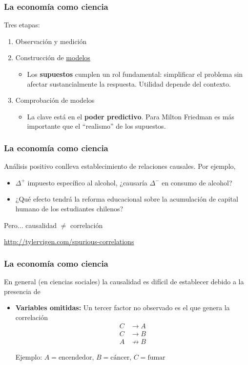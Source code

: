 \documentclass[dvipsnames,table]{beamer}
\newcommand{\peq}[1]{{\scriptscriptstyle{#1}}}
\begin{document}
		\begin{frame}
			\frametitle{La economía como ciencia}
			Tres etapas:
			\begin{enumerate}
				\item Observación y medición
				\item Construcción de \href{http://dle.rae.es/?id=PTk5Wk1}{modelos}
					\begin{itemize}
						\item Los \textbf{supuestos} cumplen un rol fundamental: simplificar el problema sin afectar sustancialmente la respuesta. Utilidad depende del contexto.
					\end{itemize}
				\item Comprobación de modelos
					\begin{itemize}
						\item La clave está en el \textbf{poder predictivo}. Para Milton Friedman es más importante que el ``realismo'' de los supuestos.
					\end{itemize}
			\end{enumerate}
		\end{frame}	

		\begin{frame}
			\frametitle{La economía como ciencia}
			Análisis positivo conlleva establecimiento de relaciones causales. Por ejemplo,
			\begin{itemize}
				\item $\Delta^\peq{+}$ impuesto específico al alcohol, ¿causaría $\Delta^\peq{-}$ en consumo de alcohol?
				\item ¿Qué efecto tendrá la reforma educacional sobre la acumulación de capital humano de los estudiantes chilenos?
			\end{itemize}
			
			\vspace{.4cm}
			Pero... causalidad $\neq$ correlación
			
			\vspace{.4cm}
			\url{http://tylervigen.com/spurious-correlations}
		\end{frame}	
	
		\begin{frame}
			\frametitle{La economía como ciencia}
			En general (en ciencias sociales) la causalidad es difícil de establecer debido a la presencia de
			\begin{itemize}
				\item \textbf{Variables omitidas:} Un tercer factor no observado es el que genera la correlación
					\begin{align*}
						C&\to A\\
						C&\to B \\
						A&\not\to B
					\end{align*}
								
				\vspace{.4cm}
				Ejemplo: $A=\text{encendedor, }B=\text{cáncer, }C=\text{fumar}$
			\end{itemize}
		\end{frame}	
	
\end{document}
